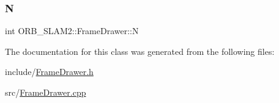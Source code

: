 \mbox{\label{class_o_r_b___s_l_a_m2_1_1_frame_drawer_adbc9489192f5485ece966b0d6d589e47}} 
\subsubsection{\texorpdfstring{N}{N}}
{\footnotesize\ttfamily int O\+R\+B\+\_\+\+S\+L\+A\+M2\+::\+Frame\+Drawer\+::N\hspace{0.3cm}{\ttfamily [protected]}}



The documentation for this class was generated from the following files\+:\begin{DoxyCompactItemize}
\item 
include/\mbox{\hyperlink{_frame_drawer_8h}{Frame\+Drawer.\+h}}\item 
src/\mbox{\hyperlink{_frame_drawer_8cpp}{Frame\+Drawer.\+cpp}}\end{DoxyCompactItemize}
